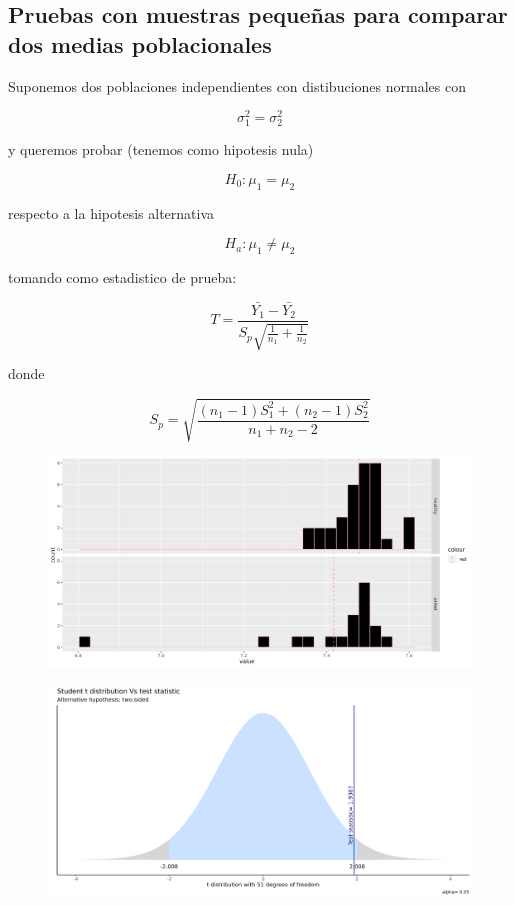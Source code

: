 		

\subsection{Pruebas con muestras pequeñas para comparar dos medias poblacionales}

Suponemos dos poblaciones independientes con distibuciones normales con 

$$\sigma_{1}^{2} = \sigma_{2}^{2}$$

y queremos probar (tenemos como hipotesis nula)

$$H_{0} : \mu_{1} = \mu _{2}$$

respecto a la hipotesis alternativa

$$H_{a} : \mu_{1} \neq \mu _{2}$$

tomando como estadistico de prueba:

$$ T = \frac{\bar{Y_{1}} - \bar{Y_{2}}}{S_{p}\sqrt{\frac{1}{n_{1}} + \frac{1}{n_{2}}}}$$

donde  

$$ S_{p} = \sqrt{\frac{(n_{1}-1)S_{1}^{2} + (n_{2}-1)S_{2}^{2}}{n_{1} + n_{2} - 2}}$$

\begin{figure}[!]
\centering
\includegraphics[width=\textwidth]{Img/cap2/medias_Shannon.png}
\caption{}
\end{figure}

\begin{figure}[!]
\centering
\includegraphics[width=\textwidth]{Img/cap2/pruebat_varianzasiguales_Shannon.png}
\caption{}
\end{figure}


